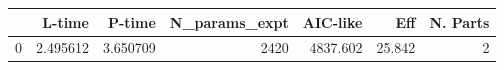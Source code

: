 \begin{tabular}{lrrrrrr}
\toprule
{} &    L-time &    P-time &  N\_params\_expt &  AIC-like &     Eff &  N. Parts \\
\midrule
0 &  2.495612 &  3.650709 &           2420 &  4837.602 &  25.842 &         2 \\
\bottomrule
\end{tabular}
